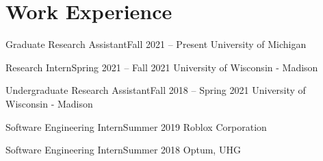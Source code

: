 \section{Work Experience}
  \CVSubHeadingListStart

    \CVSubheading
      {Graduate Research Assistant}{Fall 2021 -- Present}
      {University of Michigan}{}
      
    \CVSubheading
      {Research Intern}{Spring 2021 -- Fall 2021}
      {University of Wisconsin - Madison}{}
      
    \CVSubheading
      {Undergraduate Research Assistant}{Fall 2018 -- Spring 2021}
      {University of Wisconsin - Madison}{}

    \CVSubheading
      {Software Engineering Intern}{Summer 2019}
      {Roblox Corporation}{}

    \CVSubheading
      {Software Engineering Intern}{Summer 2018}
      {Optum, UHG}{}

  \CVSubHeadingListEnd